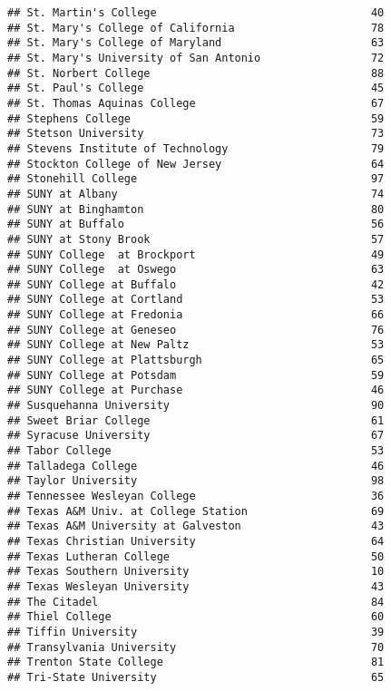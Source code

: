 \documentclass[
]{article}
\begin{document}
\begin{verbatim}
## St. Martin's College                                 40
## St. Mary's College of California                     78
## St. Mary's College of Maryland                       63
## St. Mary's University of San Antonio                 72
## St. Norbert College                                  88
## St. Paul's College                                   45
## St. Thomas Aquinas College                           67
## Stephens College                                     59
## Stetson University                                   73
## Stevens Institute of Technology                      79
## Stockton College of New Jersey                       64
## Stonehill College                                    97
## SUNY at Albany                                       74
## SUNY at Binghamton                                   80
## SUNY at Buffalo                                      56
## SUNY at Stony Brook                                  57
## SUNY College  at Brockport                           49
## SUNY College  at Oswego                              63
## SUNY College at Buffalo                              42
## SUNY College at Cortland                             53
## SUNY College at Fredonia                             66
## SUNY College at Geneseo                              76
## SUNY College at New Paltz                            53
## SUNY College at Plattsburgh                          65
## SUNY College at Potsdam                              59
## SUNY College at Purchase                             46
## Susquehanna University                               90
## Sweet Briar College                                  61
## Syracuse University                                  67
## Tabor College                                        53
## Talladega College                                    46
## Taylor University                                    98
## Tennessee Wesleyan College                           36
## Texas A&M Univ. at College Station                   69
## Texas A&M University at Galveston                    43
## Texas Christian University                           64
## Texas Lutheran College                               50
## Texas Southern University                            10
## Texas Wesleyan University                            43
## The Citadel                                          84
## Thiel College                                        60
## Tiffin University                                    39
## Transylvania University                              70
## Trenton State College                                81
## Tri-State University                                 65

\end{verbatim}
\end{document}
